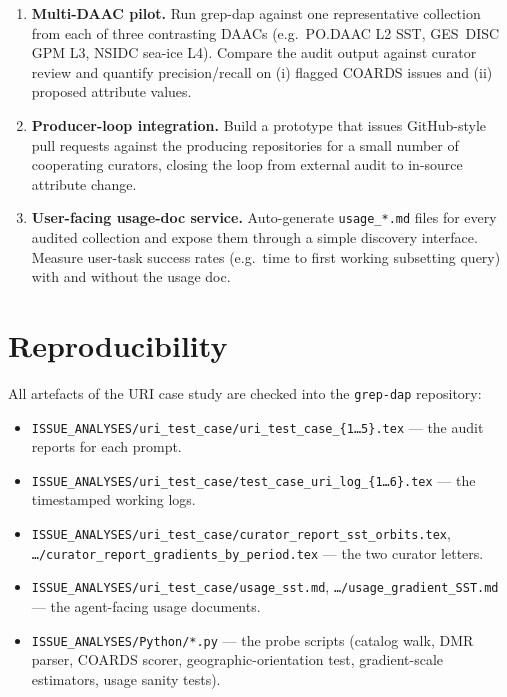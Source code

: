 \documentclass[11pt]{article}
\begin{document}
\begin{enumerate}[topsep=2pt,leftmargin=2em]
  \item \textbf{Multi-DAAC pilot.} Run grep-dap against one
    representative collection from each of three contrasting
    DAACs (e.g.\ PO.DAAC L2 SST, GES~DISC GPM L3, NSIDC sea-ice
    L4). Compare the audit output against curator review and
    quantify precision/recall on (i) flagged COARDS issues and
    (ii) proposed attribute values.
  \item \textbf{Producer-loop integration.} Build a prototype
    that issues GitHub-style pull requests against the producing
    repositories for a small number of cooperating curators,
    closing the loop from external audit to in-source attribute
    change.
  \item \textbf{User-facing usage-doc service.} Auto-generate
    \texttt{usage\_*.md} files for every audited collection and
    expose them through a simple discovery interface. Measure
    user-task success rates (e.g.\ time to first working
    subsetting query) with and without the usage doc.
\end{enumerate}

\section{Reproducibility}\label{sec:repro}

All artefacts of the URI case study are checked into the
\texttt{grep-dap} repository:

\begin{itemize}[topsep=2pt]
  \item \texttt{ISSUE\_ANALYSES/uri\_test\_case/uri\_test\_case\_\{1\dots5\}.tex}
    --- the audit reports for each prompt.
  \item \texttt{ISSUE\_ANALYSES/uri\_test\_case/test\_case\_uri\_log\_\{1\dots6\}.tex}
    --- the timestamped working logs.
  \item \texttt{ISSUE\_ANALYSES/uri\_test\_case/curator\_report\_sst\_orbits.tex},
    \texttt{\dots/curator\_report\_gradients\_by\_period.tex} ---
    the two curator letters.
  \item \texttt{ISSUE\_ANALYSES/uri\_test\_case/usage\_sst.md},
    \texttt{\dots/usage\_gradient\_SST.md} --- the agent-facing
    usage documents.
  \item \texttt{ISSUE\_ANALYSES/Python/*.py} --- the probe scripts
    (catalog walk, DMR parser, COARDS scorer,
    geographic-orientation test, gradient-scale estimators, usage
    sanity tests).
\end{itemize}
\end{document}
